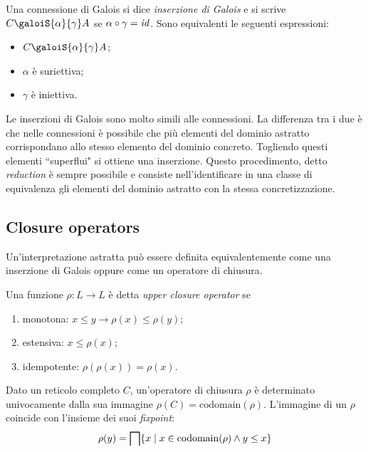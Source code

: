 \begin{definition}
Una connessione di Galois si dice \emph{inserzione di Galois} e si scrive $C \galoiS{\alpha}{\gamma} A$ se $\alpha \circ \gamma = \mathit{id}$. Sono equivalenti le seguenti espressioni:
\begin{itemize}
    \item $C \galoiS{\alpha}{\gamma} A$;
    \item $\alpha$ è suriettiva;
    \item $\gamma$ è iniettiva.
\end{itemize}
\end{definition}

Le inserzioni di Galois sono molto simili alle connessioni. La differenza tra i due è che nelle connessioni è possibile che più elementi del dominio astratto corrispondano allo stesso elemento del dominio concreto. Togliendo questi elementi ``superflui" si ottiene una inserzione. Questo procedimento, detto \emph{reduction} è sempre possibile e consiste nell'identificare in una classe di equivalenza gli elementi del dominio astratto con la stessa concretizzazione.

\subsection{Closure operators}

Un'interpretazione astratta può essere definita equivalentemente come una inserzione di Galois oppure come un operatore di chiusura.

\begin{definition}
Una funzione $\rho: L \to L$ è detta \emph{upper closure operator} se
\begin{enumerate}
    \item monotona: $x \le y \to \rho(x) \le \rho(y)$;
    \item estensiva: $x \le \rho(x)$;
    \item idempotente: $\rho(\rho(x)) = \rho(x)$.
\end{enumerate}
\end{definition}

Dato un reticolo completo $C$, un'operatore di chiusura $\rho$ è determinato univocamente dalla sua immagine $\rho(C) = \mathrm{codomain}(\rho)$. L'immagine di un $\rho$ coincide con l'insieme dei suoi \emph{fixpoint}:
\[ \rho(y) = \meet[\{x \mid x \in \mathrm{codomain}(\rho) \land y \le x \}] \]

